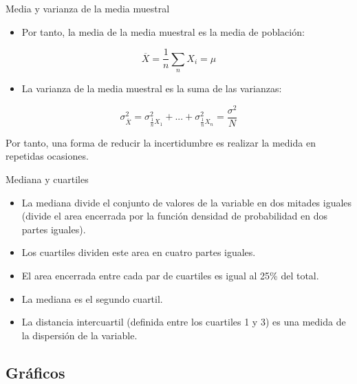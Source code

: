 \documentclass[xcolor={usenames,svgnames,dvipsnames}]{beamer}
\begin{document}
\begin{frame}[label=sec-7-1-8]{Media y varianza de la media muestral}
\begin{itemize}
\item Por tanto, la \alert{media de la media muestral} es la media de población:
\end{itemize}
\[
\overline{X}=\frac{1}{n}\sum_{n}X_{i} = \mu
\]

\begin{itemize}
\item La \alert{varianza de la media muestral} es la suma de las varianzas:
\end{itemize}

\[
\sigma_{\overline{X}}^{2}=\sigma_{\frac{1}{n}X_{1}}^{2}+...+\sigma_{\frac{1}{n}X_{n}}^{2}=\frac{\sigma^2}{N}
\]

\begin{block}{}
Por tanto, una forma de \alert{reducir la incertidumbre} es realizar la
\alert{medida en repetidas ocasiones}.
\end{block}
\end{frame}



\begin{frame}[label=sec-7-1-9]{Mediana y cuartiles}
\begin{itemize}
\item La \alert{mediana} divide el conjunto de valores de la variable en \alert{dos
mitades} iguales (divide el area encerrada por la función densidad
de probabilidad en dos partes iguales).
\item Los \alert{cuartiles} dividen este area en \alert{cuatro} partes iguales.
\item El area encerrada entre cada par de cuartiles es igual al 25\% del total.
\item La \alert{mediana} es el \alert{segundo cuartil}.
\item La \alert{distancia intercuartil} (definida entre los cuartiles 1 y 3) es
una \alert{medida de la dispersión} de la variable.
\end{itemize}
\end{frame}


\subsection{Gráficos}
\label{sec-7-2}
\end{document}
